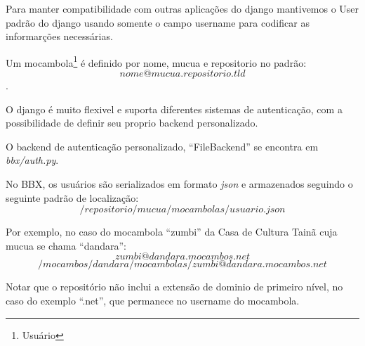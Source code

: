 Para manter compatibilidade com outras aplicações do django mantivemos
o User padrão do django usando somente o campo username para codificar
as informarções necessárias.

Um mocambola\footnote{Usuário} é definido por nome, mucua e
repositorio no padrão:
$$ nome@mucua.repositorio.tld $$ .

O django é muito flexivel e suporta diferentes sistemas de
autenticação, com a possibilidade de definir seu proprio backend
personalizado.

O backend de autenticação personalizado, ``FileBackend'' se encontra
em \emph{bbx/auth.py}.

No BBX, os usuários são serializados em formato \emph{json} e
armazenados seguindo o seguinte padrão de localização:
$$ /repositorio/mucua/mocambolas/usuario.json $$

Por exemplo, no caso do mocambola ``zumbi'' da Casa de Cultura
Tainã cuja mucua se chama ``dandara'':
$$ zumbi@dandara.mocambos.net $$
$$ /mocambos/dandara/mocambolas/zumbi@dandara.mocambos.net $$

Notar que o repositório não inclui a extensão de dominio de primeiro
nível, no caso do exemplo ``.net'', que permanece no username do
mocambola.



